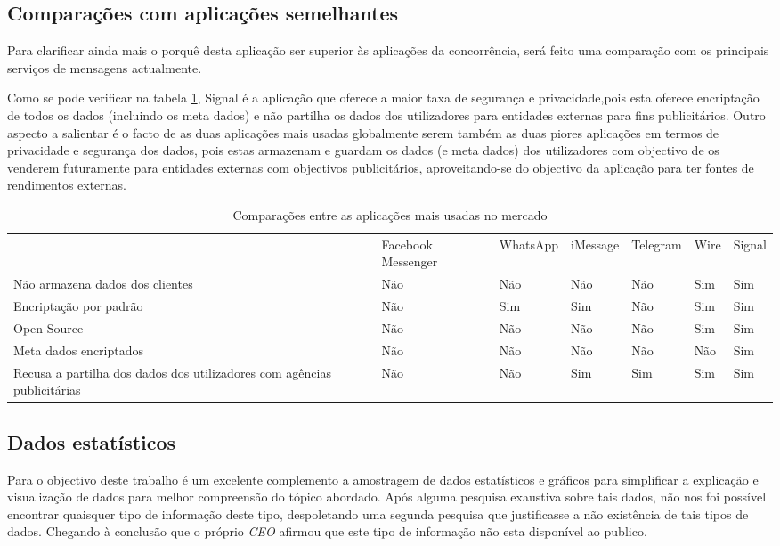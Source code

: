 \subsection{Comparações com aplicações semelhantes}
\label{sec:comparacoes}
Para clarificar ainda mais o porquê desta aplicação ser superior às aplicações da concorrência, será feito uma comparação com os principais serviços de mensagens actualmente.

Como se pode verificar na tabela \ref{tab:comparacoes}, Signal é a aplicação que oferece a maior taxa de segurança e privacidade,pois esta oferece encriptação de todos os dados (incluindo os meta dados) e não partilha os dados dos utilizadores para entidades externas para fins publicitários.
Outro aspecto a salientar é o facto de as duas aplicações mais usadas globalmente serem também as duas piores aplicações em termos de privacidade e segurança dos dados, pois estas armazenam e guardam os dados (e meta dados) dos utilizadores com objectivo de os venderem futuramente para entidades externas com objectivos publicitários, aproveitando-se do objectivo da aplicação para ter fontes de rendimentos externas.

\begin{table}[!h]

\centering
\begin{adjustbox}{width=1\textwidth}
\begin{tabular}{lllllll}
                                & Facebook Messenger & WhatsApp & iMessage & Telegram & Wire & Signal \\
Não armazena dados dos clientes & Não                & Não      & Não      & Não      & Sim  & Sim    \\
Encriptação por padrão          & Não                & Sim      & Sim      & Não      & Sim  & Sim    \\
Open Source                     & Não                & Não      & Não      & Não      & Sim  & Sim    \\
Meta dados encriptados          & Não                & Não      & Não      & Não      & Não  & Sim    \\
Recusa a partilha dos dados dos utilizadores com agências publicitárias & Não & Não & Sim & Sim & Sim & Sim
\end{tabular}
\label{tab:comparacoes}
\end{adjustbox}
\caption{Comparações entre as aplicações mais usadas no mercado}
\end{table}


\subsection{Dados estatísticos}
\label{sec:estatis}
Para o objectivo deste trabalho é um excelente complemento a amostragem de dados estatísticos e gráficos para simplificar a explicação e visualização de dados para melhor compreensão do tópico abordado.
Após alguma pesquisa exaustiva sobre tais dados, não nos foi possível encontrar quaisquer tipo de informação deste tipo, despoletando uma segunda pesquisa que justificasse a não existência de tais tipos de dados. Chegando à conclusão que o próprio \textit{CEO} afirmou que este tipo de informação não esta disponível ao publico.


